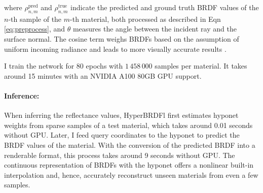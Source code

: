 where $\rho^{\text{pred}}_{n, m}$ and $\rho^{\text{true}}_{n, m}$ indicate the predicted and ground truth BRDF values of the $n$-th sample of the $m$-th material, both processed as described in Eqn \ref{eq:preprocess}, and $\theta$ measures the angle between the incident ray and the surface normal. The cosine term weighs BRDFs based on the assumption of uniform incoming radiance and leads to more visually accurate results \cite{ngan2005experimental}.


I train the network for 80 epochs with $1\,458\,000$ samples per material. It takes around 15 minutes with an NVIDIA A100 80GB GPU support. 


\paragraph{Inference:}
When inferring the reflectance values, HyperBRDFl first estimates hyponet weights from sparse samples of a test material, which takes around 0.01 seconds without GPU. Later, I feed query coordinates to the hyponet to predict the BRDF values of the material. With the conversion of the predicted BRDF into a renderable format, this process takes around 9 seconds without GPU. The continuous representation of BRDFs with the hyponet offers a nonlinear built-in interpolation and, hence, accurately reconstruct unseen materials from even a few samples.